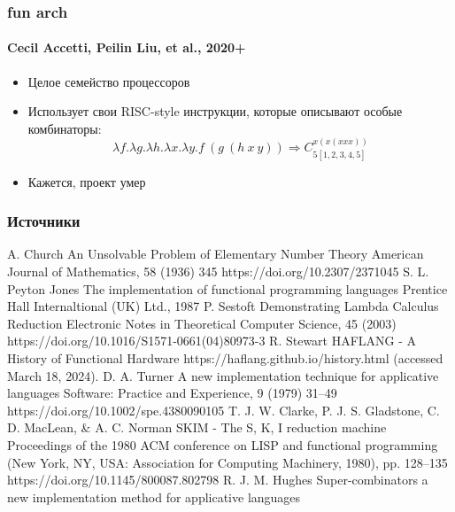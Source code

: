 \begin{frame}
    \frametitle{fun arch}
    \framesubtitle{Cecil Accetti, Peilin Liu, et al., 2020+}

    \begin{itemize}
        \item Целое семейство процессоров
        \item Использует свои RISC-style инструкции, которые описывают особые комбинаторы:
              \[\lambda f. \lambda g. \lambda h. \lambda x. \lambda y.f\ (g\ (h\ x\ y)) \Rightarrow C^{x(x(xxx))}_{5[1,2,3,4,5]}\]
        \item Кажется, проект умер
    \end{itemize}

\end{frame}

\appendix
\begin{frame}[allowframebreaks]
    \frametitle{Источники}
    \begin{thebibliography}{}
        A. Church \newblock
        An Unsolvable Problem of Elementary Number Theory \newblock
        American Journal of Mathematics, 58 (1936) 345 \newblock
        https://doi.org/10.2307/2371045
        S. L. Peyton Jones \newblock
        The implementation of functional programming languages \newblock
        Prentice Hall Internaltional (UK) Ltd., 1987
        P. Sestoft \newblock
        Demonstrating Lambda Calculus Reduction \newblock
        Electronic Notes in Theoretical Computer Science, 45 (2003) \newblock
        https://doi.org/10.1016/S1571-0661(04)80973-3
        R. Stewart \newblock
        HAFLANG - A History of Functional Hardware \newblock
        https://haflang.github.io/history.html (accessed March 18, 2024).
        D. A. Turner \newblock
        A new implementation technique for applicative languages \newblock
        Software: Practice and Experience, 9 (1979) 31–49 \newblock
        https://doi.org/10.1002/spe.4380090105
        T. J. W. Clarke, P. J. S. Gladstone, C. D. MacLean, \& A. C. Norman \newblock
        SKIM - The S, K, I reduction machine \newblock
        Proceedings of the 1980 ACM conference on LISP and functional programming (New York, NY, USA: Association for Computing Machinery, 1980), pp. 128–135 \newblock
        https://doi.org/10.1145/800087.802798
        R. J. M. Hughes \newblock
        Super-combinators a new implementation method for applicative languages \newblock

\end{thebibliography}
\end{frame}
